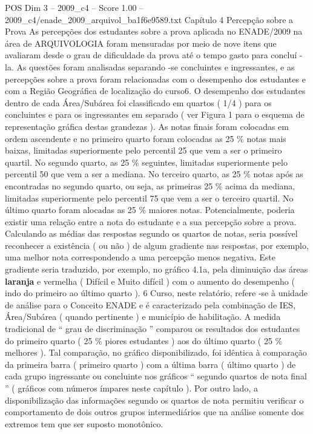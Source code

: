 \begin{textsample}{POS Dim 3 – 2009\_c4 – Score 1.00 – 2009\_c4/enade\_2009\_arquivol\_ba1f6e9589.txt}  \label{ex:f3_pos_122}
Capítulo 4 Percepção sobre a Prova As percepções dos estudantes sobre a prova aplicada no ENADE/2009 na área de ARQUIVOLOGIA foram mensuradas por meio de nove itens que avaliaram desde o grau de dificuldade da prova até o tempo gasto para concluí -la.
As questões foram analisadas separando -se concluintes e ingressantes, e as percepções sobre a prova foram relacionadas com o desempenho dos estudantes e com a Região Geográfica de localização do curso6.
O desempenho dos estudantes dentro de cada Área/Subárea foi classificado em quartos ( 1/4 ) para os concluintes e para os ingressantes em separado ( ver Figura 1 para o esquema de representação gráfica destas grandezas ).
As notas finais foram colocadas em ordem ascendente e no primeiro quarto foram colocadas as 25 \% notas mais baixas, limitadas superiormente pelo percentil 25 que vem a ser o primeiro quartil.
No segundo quarto, as 25 \% seguintes, limitadas superiormente pelo percentil 50 que vem a ser a mediana.
No terceiro quarto, as 25 \% notas após as encontradas no segundo quarto, ou seja, as primeiras 25 \% acima da mediana, limitadas superiormente pelo percentil 75 que vem a ser o terceiro quartil.
No último quarto foram alocadas as 25 \% maiores notas.
Potencialmente, poderia existir uma relação entre a nota do estudante e a sua percepção sobre a prova.
Calculando as médias das respostas segundo os quartos de notas, seria possível reconhecer a existência ( ou não ) de algum gradiente nas respostas, por exemplo, uma melhor nota correspondendo a uma percepção menos negativa.
Este gradiente seria traduzido, por exemplo, no gráfico 4.1a, pela diminuição das áreas \textbf{laranja} e vermelha ( Difícil e Muito difícil ) com o aumento do desempenho ( indo do primeiro ao último quarto ). 6 Curso, neste relatório, refere -se à unidade de análise para o Conceito ENADE e é caracterizado pela combinação de IES, Área/Subárea ( quando pertinente ) e município de habilitação.
A medida tradicional de “ grau de discriminação ” comparou os resultados dos estudantes do primeiro quarto ( 25 \% piores estudantes ) aos do último quarto ( 25 \% melhores ).
Tal comparação, no gráfico disponibilizado, foi idêntica à comparação da primeira barra ( primeiro quarto ) com a última barra ( último quarto ) de cada grupo ingressante ou concluinte nos gráficos “ segundo quartos de nota final ” ( gráficos com números ímpares neste capítulo ).
Por outro lado, a disponibilização das informações segundo os quartos de nota permitiu verificar o comportamento de dois outros grupos intermediários que na análise somente dos extremos tem que ser suposto monotônico.

\end{textsample}
